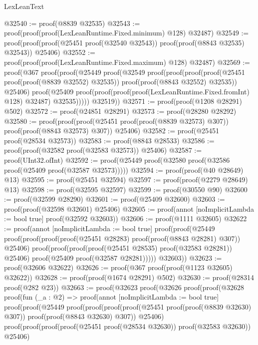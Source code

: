 \begin{lexlean}{LexLeanText}
\begin{coremodule}
@32540 := proof(@8839 @32535)
@32543 := proof(proof(proof(LexLeanRuntime.Fixed.minimum) @128) @32487)
@32549 := proof(proof(proof(@25451 proof(@32540 @32543)) proof(proof(@8843 @32535) @32543)) @25406)
@32552 := proof(proof(proof(LexLeanRuntime.Fixed.maximum) @128) @32487)
@32569 := proof(@367
      proof(proof(@25449
            proof(@32549
                proof(proof(proof(proof(@25451 proof(proof(@8839 @32552) @32535))
                        proof(proof(@8843 @32552) @32535))
                      @25406)
                    proof(@25409
                        proof(proof(proof(proof(LexLeanRuntime.Fixed.fromInt) @128) @32487)
                            @32535)))))
          @32519))
@32571 := proof(proof(@1208 @28291) @502)
@32572 := proof(@24851 @28291)
@32573 := proof(@28280 @28292)
@32580 := proof(proof(proof(@25451 proof(proof(@8839 @32573) @307)) proof(proof(@8843 @32573) @307))
      @25406)
@32582 := proof(@25451 proof(@28534 @32573))
@32583 := proof(@8843 @28533)
@32586 := proof(proof(@32582 proof(@32583 @32573)) @25406)
@32587 := proof(UInt32.ofInt)
@32592 := proof(@25449 proof(@32580 proof(@32586 proof(@25409 proof(@32587 @32573)))))
@32594 := proof(proof(@40 @28649) @13)
@32595 := proof(@25451 @32594)
@32597 := proof(proof(@2279 @28649) @13)
@32598 := proof(@32595 @32597)
@32599 := proof(@30550 @90)
@32600 := proof(@32599 @28290)
@32601 := proof(@25409 @32600)
@32603 := proof(proof(@32598 @32601) @25406)
@32605 := proof(annot [noImplicitLambda := bool true] proof(@32592 @32603))
@32606 := proof(@1111 @32605)
@32622 := proof(annot [noImplicitLambda := bool true]
    proof(proof(@25449
          proof(proof(proof(proof(@25451 @28283) proof(proof(@8843 @28281) @307)) @25406)
              proof(proof(proof(proof(@25451 @28535) proof(@32583 @28281)) @25406)
                  proof(@25409 proof(@32587 @28281)))))
        @32603))
@32623 := proof(@32606 @32622)
@32626 := proof(@367 proof(proof(@1123 @32605) @32622))
@32628 := proof(proof(@1674 @28291) @502)
@32630 := proof(@28314 proof(@282 @23))
@32663 := proof(@32623
      proof(@32626
          proof(proof(@32628
                proof(fun (_a : @2) =>
                  proof(annot [noImplicitLambda := bool true]
                    proof(proof(@25449
                          proof(proof(proof(proof(@25451 proof(proof(@8839 @32630) @307))
                                  proof(proof(@8843 @32630) @307))
                                @25406)
                              proof(proof(proof(proof(@25451 proof(@28534 @32630))
                                      proof(@32583 @32630))
                                    @25406)

\end{coremodule}
\end{lexlean}

